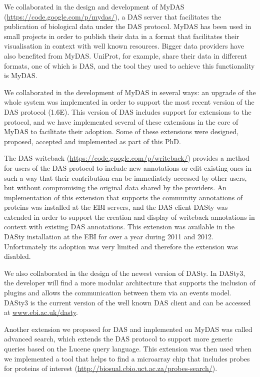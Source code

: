 We collaborated in the design and development of MyDAS (\url{https://code.google.com/p/mydas/}), a DAS server that facilitates the publication of biological data under the DAS protocol. MyDAS has been used in small projects in order to publish their data in a format that facilitates their visualisation in context with well known resources. Bigger data providers have also benefited from MyDAS. UniProt, for example, share their data in different formats, one of which is DAS, and the tool they used to achieve this functionality is MyDAS.

We collaborated in the development of MyDAS in several ways: an upgrade of the whole system was implemented in order to support the most recent version of the DAS protocol (1.6E). This version of DAS includes support for extensions to the protocol, and we have implemented several of these extensions in the core of MyDAS to facilitate their adoption. Some of these extensions were designed, proposed, accepted and implemented as part of this PhD. 

The DAS writeback (\url{https://code.google.com/p/writeback/}) provides a method for users of the DAS protocol to include new annotations or edit existing ones in such a way that their contribution can be immediately accessed by other users, but without compromising the original data shared by the providers. An implementation of this extension that supports the community annotations of proteins was installed at the EBI servers, and the DAS client DASty was extended in order to support the creation and display of writeback annotations in context with existing DAS annotations. This extension was available in the DASty installation at the EBI for over a year during 2011 and 2012. Unfortunately its adoption was very limited and therefore the extension was disabled.

We also collaborated in the design of the newest version of DASty. In DASty3, the developer will find a more modular architecture that supports the inclusion of plugins and allows the communication between them via an events model. DASty3 is the current version of the well known DAS client and can be accessed at \url{www.ebi.ac.uk/dasty}.

Another extension we proposed for DAS and implemented on MyDAS was called advanced search, which extends the DAS  protocol to support more generic queries based on the Lucene query language. This extension was then used when we implemented a tool that helps to find a microarray chip that includes probes for proteins of interest (\url{http://biosual.cbio.uct.ac.za/probes-search/}).

